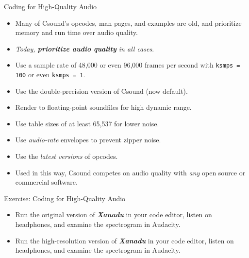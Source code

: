 \documentclass{beamer}
\begin{document}
    \begin{frame}{Coding for High-Quality Audio}
        \begin{itemize}
            \item Many of Csound's opcodes, man pages, and examples are old, and
            prioritize memory and run time over audio quality.
            \item \textit{Today, \textbf{prioritize audio quality} in all cases}.
            \item Use a sample rate of 48,000 or even 96,000 frames per second with
            \texttt{ksmps = 100} or even \texttt{ksmps = 1}.
            \item Use the double-precision version of Csound (now default).
            \item Render to floating-point soundfiles for high dynamic range.
            \item Use table sizes of at least 65,537 for lower noise.
            \item Use \textit{audio-rate} envelopes to prevent zipper noise.
            \item Use the \textit{latest versions} of opcodes.
            \item Used in this way, Csound competes on audio quality with
            \textit{any} open source or commercial software.
        \end{itemize}
    \end{frame}
    \begin{frame}{Exercise: Coding for High-Quality Audio}
        \begin{itemize}
            \item Run the original version of \textit{\textbf{Xanadu}} in your code
            editor, listen on headphones, and examine the spectrogram in Audacity.
            \item Run the high-resolution version of \textit{\textbf{Xanadu}} in
            your code editor, listen on headphones, and examine the spectrogram in Audacity.
        \end{itemize}
    \end{frame}
    
\end{document}
